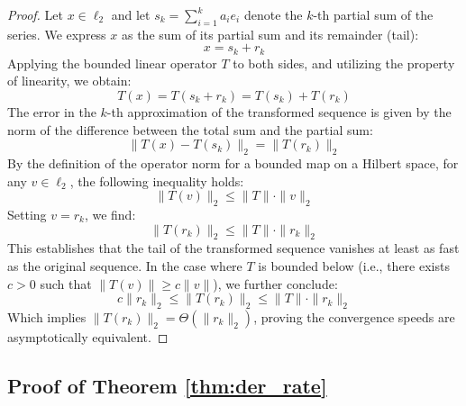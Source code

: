 \documentclass{article}
\theoremstyle{definition}
\theoremstyle{definition}
\theoremstyle{plain}
\theoremstyle{plain}
\theoremstyle{plain}
\theoremstyle{plain}
\theoremstyle{plain}
\begin{document}
\begin{proof}
Let $x \in \ell_2$ and let $s_k = \sum_{i=1}^{k} a_i e_i$ denote the $k$-th partial sum of the series. We express $x$ as the sum of its partial sum and its remainder (tail):
\begin{equation}
    x = s_k + r_k
\end{equation}
Applying the bounded linear operator $T$ to both sides, and utilizing the property of linearity, we obtain:
\begin{equation}
    T(x) = T(s_k + r_k) = T(s_k) + T(r_k)
\end{equation}
The error in the $k$-th approximation of the transformed sequence is given by the norm of the difference between the total sum and the partial sum:
\begin{equation}
    \|T(x) - T(s_k)\|_2 = \|T(r_k)\|_2
\end{equation}
By the definition of the operator norm for a bounded map on a Hilbert space, for any $v \in \ell_2$, the following inequality holds:
\begin{equation}
    \|T(v)\|_2 \leq \|T\| \cdot \|v\|_2
\end{equation}
Setting $v = r_k$, we find:
\begin{equation}
    \|T(r_k)\|_2 \leq \|T\| \cdot \|r_k\|_2
\end{equation}
This establishes that the tail of the transformed sequence vanishes at least as fast as the original sequence. In the case where $T$ is bounded below (i.e., there exists $c > 0$ such that $\|T(v)\| \geq c\|v\|$), we further conclude:
\begin{equation}
    c \|r_k\|_2 \leq \|T(r_k)\|_2 \leq \|T\| \cdot \|r_k\|_2
\end{equation}
Which implies $\|T(r_k)\|_2 = \Theta(\|r_k\|_2)$, proving the convergence speeds are asymptotically equivalent.
\end{proof}

\subsection{Proof of Theorem \ref{thm:der_rate}}
\end{document}
